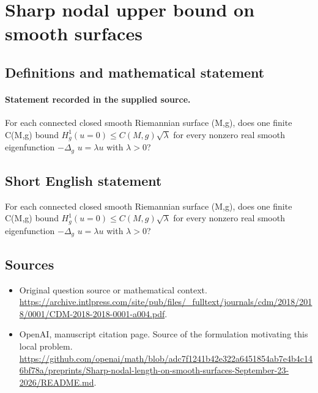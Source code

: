 \documentclass[11pt]{article}
\begin{document}
\section*{Sharp nodal upper bound on smooth surfaces}\label{30007163}
\subsection{Definitions and mathematical statement}
\paragraph{Statement recorded in the supplied source.}
For each connected closed smooth Riemannian surface (M,g), does one finite C(M,g) bound $H^{1}_g({u=0})\leq C(M,g)\surd \lambda $ for every nonzero real smooth eigenfunction $-\Delta _g$ $u=\lambda u$ with $\lambda >0$?
\subsection{Short English statement}
For each connected closed smooth Riemannian surface (M,g), does one finite C(M,g) bound $H^{1}_g({u=0})\leq C(M,g)\surd \lambda $ for every nonzero real smooth eigenfunction $-\Delta _g$ $u=\lambda u$ with $\lambda >0$?
\subsection{Sources}
\begin{itemize}
\item[S1] Original question source or mathematical context.
\url{https://archive.intlpress.com/site/pub/files/_fulltext/journals/cdm/2018/2018/0001/CDM-2018-2018-0001-a004.pdf}.
\item[S2] OpenAI, manuscript citation page. Source of the formulation motivating this local problem.
\url{https://github.com/openai/math/blob/adc7f1241b42e322a6451854ab7e4b4c146bf78a/preprints/Sharp-nodal-length-on-smooth-surfaces-September-23-2026/README.md}.
\end{itemize}
\end{document}
